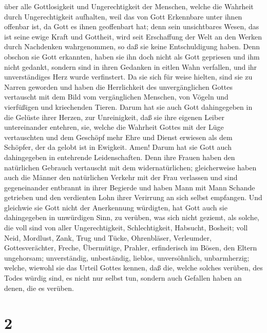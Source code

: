 über alle Gottlosigkeit und Ungerechtigkeit der Menschen, welche die
Wahrheit durch Ungerechtigkeit aufhalten,  weil das von
Gott Erkennbare unter ihnen offenbar ist, da Gott es ihnen geoffenbart
hat;  denn sein unsichtbares Wesen, das ist seine ewige
Kraft und Gottheit, wird seit Erschaffung der Welt an den Werken durch
Nachdenken wahrgenommen, so daß sie keine Entschuldigung haben.
 Denn obschon sie Gott erkannten, haben sie ihn doch
nicht als Gott gepriesen und ihm nicht gedankt, sondern sind in ihren
Gedanken in eitlen Wahn verfallen, und ihr unverständiges Herz wurde
verfinstert.  Da sie sich für weise hielten, sind sie zu
Narren geworden  und haben die Herrlichkeit des
unvergänglichen Gottes vertauscht mit dem Bild vom vergänglichen
Menschen, von Vögeln und vierfüßigen und kriechenden Tieren.
 Darum hat sie auch Gott dahingegeben in die Gelüste
ihrer Herzen, zur Unreinigkeit, daß sie ihre eigenen Leiber
untereinander entehren,  sie, welche die Wahrheit Gottes
mit der Lüge vertauschten und dem Geschöpf mehr Ehre und Dienst erwiesen
als dem Schöpfer, der da gelobt ist in Ewigkeit. Amen! 
Darum hat sie Gott auch dahingegeben in entehrende Leidenschaften. Denn
ihre Frauen haben den natürlichen Gebrauch vertauscht mit dem
widernatürlichen;  gleicherweise haben auch die Männer
den natürlichen Verkehr mit der Frau verlassen und sind gegeneinander
entbrannt in ihrer Begierde und haben Mann mit Mann Schande getrieben
und den verdienten Lohn ihrer Verirrung an sich selbst empfangen.
 Und gleichwie sie Gott nicht der Anerkennung würdigten,
hat Gott auch sie dahingegeben in unwürdigen Sinn, zu verüben, was sich
nicht geziemt,  als solche, die voll sind von aller
Ungerechtigkeit, Schlechtigkeit, Habsucht, Bosheit; voll Neid, Mordlust,
Zank, Trug und Tücke,  Ohrenbläser, Verleumder,
Gottesverächter, Freche, Übermütige, Prahler, erfinderisch im Bösen, den
Eltern ungehorsam;  unverständig, unbeständig, lieblos,
unversöhnlich, unbarmherzig;  welche, wiewohl sie das
Urteil Gottes kennen, daß die, welche solches verüben, des Todes würdig
sind, es nicht nur selbst tun, sondern auch Gefallen haben an denen, die
es verüben.

\hypertarget{section-1}{%
\section{2}\label{section-1}}

